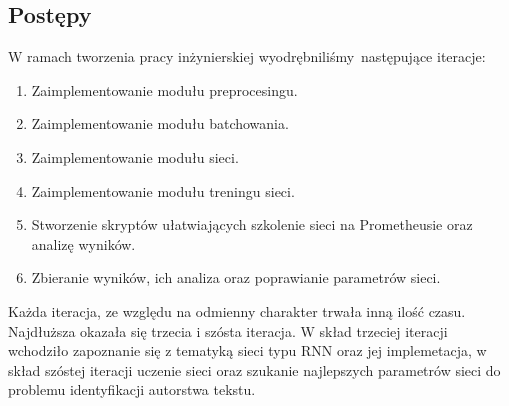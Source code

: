 \subsection{Postępy}
W ramach tworzenia pracy inżynierskiej wyodrębniliśmy następujące iteracje:
\begin{enumerate}
  \item Zaimplementowanie modułu preprocesingu.
  \item Zaimplementowanie modułu batchowania.
  \item Zaimplementowanie modułu sieci.
  \item Zaimplementowanie modułu treningu sieci.
  \item Stworzenie skryptów ułatwiających szkolenie sieci na Prometheusie oraz analizę wyników.
  \item Zbieranie wyników, ich analiza oraz poprawianie parametrów sieci.
\end{enumerate}  

  Każda iteracja, ze względu na odmienny charakter trwała inną ilość czasu. Najdłuższa okazała się
trzecia i szósta iteracja. W skład trzeciej iteracji wchodziło zapoznanie się z tematyką sieci typu RNN oraz
jej implemetacja, w skład szóstej iteracji uczenie sieci oraz szukanie najlepszych parametrów sieci do problemu 
identyfikacji autorstwa tekstu.

